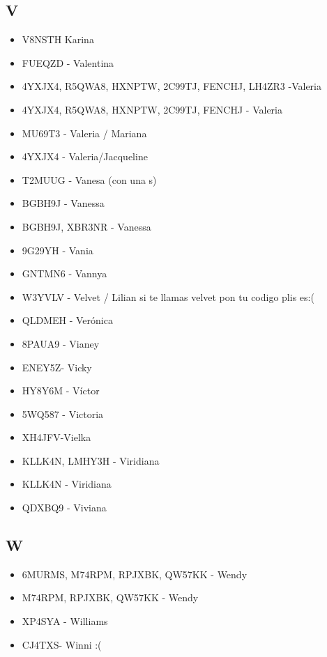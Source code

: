\subsection*{V}
\begin{itemize}[leftmargin=*,nosep]
\item V8NSTH Karina
\item FUEQZD - Valentina
\item 4YXJX4, R5QWA8, HXNPTW, 2C99TJ, FENCHJ, LH4ZR3 -Valeria
\item 4YXJX4, R5QWA8, HXNPTW, 2C99TJ, FENCHJ - Valeria
\item MU69T3 - Valeria / Mariana
\item 4YXJX4 - Valeria/Jacqueline
\item T2MUUG - Vanesa (con una s)
\item BGBH9J - Vanessa
\item BGBH9J, XBR3NR - Vanessa
\item 9G29YH - Vania
\item GNTMN6 - Vannya
\item W3YVLV - Velvet / Lilian si te llamas velvet pon tu codigo plis es:(
\item QLDMEH - Verónica
\item 8PAUA9 - Vianey
\item ENEY5Z- Vicky
\item HY8Y6M - Víctor
\item 5WQ587 - Victoria
\item XH4JFV-Vielka
\item KLLK4N, LMHY3H - Viridiana
\item KLLK4N - Viridiana
\item QDXBQ9 - Viviana
\end{itemize}

\subsection*{W}
\begin{itemize}[leftmargin=*,nosep]
\item 6MURMS, M74RPM, RPJXBK, QW57KK - Wendy
\item M74RPM, RPJXBK, QW57KK - Wendy
\item XP4SYA - Williams
\item CJ4TXS- Winni :(
\end{itemize}

